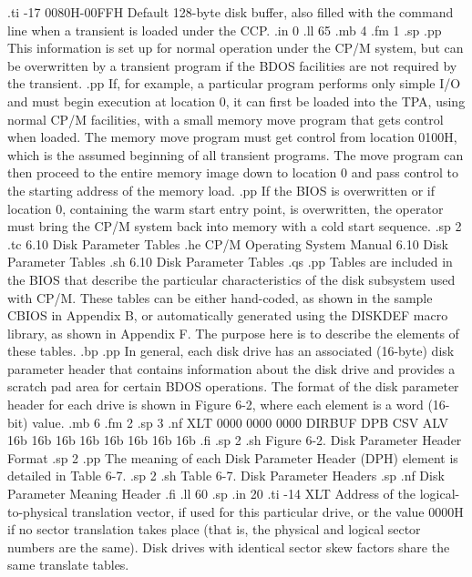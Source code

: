 .ti -17
0080H-00FFH      Default 128-byte disk buffer, also filled with the 
command line when a transient is loaded under the CCP.
.in 0
.ll 65
.mb 4
.fm 1
.sp
.pp
This information is set up for normal operation under the CP/M 
system, but can be overwritten by a transient program if the BDOS 
facilities are not required by the transient. 
.pp
If, for example, a particular program performs only simple I/O 
and must begin execution at location 0, it can first be loaded 
into the TPA, using normal CP/M facilities, with a small memory 
move program that gets control when loaded.  The memory move 
program must get control from location 0100H, which is the 
assumed beginning of all transient programs.  The move program can 
then proceed to the entire memory image down to location 0 and 
pass control to the starting address of the memory load.  
.pp
If the BIOS is overwritten or if location 0, containing the warm 
start entry point, is overwritten, the operator must bring the 
CP/M system back into memory with a cold start sequence.
.sp 2
.tc    6.10  Disk Parameter Tables
.he CP/M Operating System Manual          6.10  Disk Parameter Tables
.sh
6.10  Disk Parameter Tables
.qs
.pp
Tables are included in the BIOS that describe the particular 
characteristics of the disk subsystem used with CP/M.  These 
tables can be either hand-coded, as shown in the sample CBIOS in 
Appendix B, or automatically generated using the DISKDEF macro 
library, as shown in Appendix F.  The purpose here is to describe 
the elements of these tables.
.bp
.pp
In general, each disk drive has an associated (16-byte) disk 
parameter header that contains information about the disk drive 
and provides a scratch pad area for certain BDOS operations.  The 
format of the disk parameter header for each drive is shown 
in Figure 6-2, where each element is a word (16-bit) value.
.mb 6
.fm 2
.sp 3
.nf
XLT     0000     0000     0000     DIRBUF     DPB     CSV     ALV
16b     16b      16b      16b      16b        16b     16b     16b   
.fi
.sp 2
.sh
            Figure 6-2.  Disk Parameter Header Format
.sp 2
.pp
The meaning of each Disk Parameter Header (DPH) element is detailed in Table 
6-7.
.sp 2
.sh
               Table 6-7.  Disk Parameter Headers
.sp
.nf
  Disk Parameter                 Meaning
      Header
.fi
.ll 60
.sp
.in 20
.ti -14
XLT           Address of the logical-to-physical translation vector, if used 
for this particular drive, or the value 0000H if no sector translation 
takes place (that is, the physical and logical sector numbers are the same).  
Disk drives with identical sector skew factors share the same translate tables.
